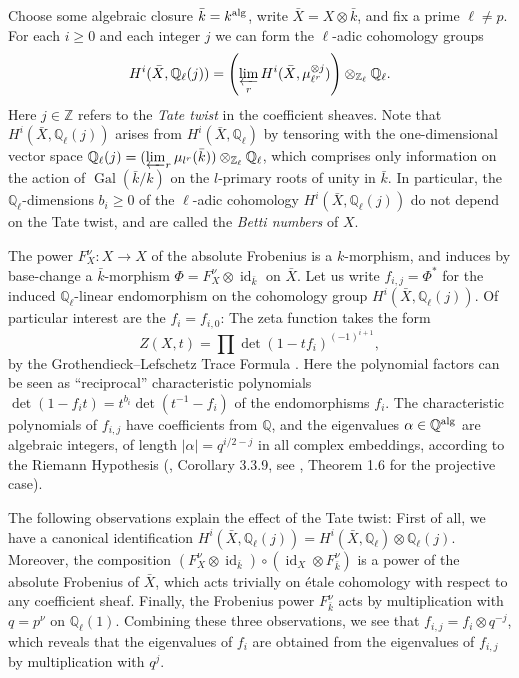 \documentclass[oneside, 12pt]{amsart}
\theoremstyle{definition}
\theoremstyle{remark}
\newcommand{\ZZ}{\mathbb{Z}}
\newcommand{\QQ}{\mathbb{Q}}
\newcommand{\alg}{\text{\rm alg}}
\newcommand{\Gal}{\operatorname{Gal}}
\newcommand{\id}{{\operatorname{id}}}
\newcommand{\invlim}{\varprojlim}
\newcommand{\ra}{\rightarrow}
\newcommand{\bk}{{\bar{k}}}
\newcommand{\bX}{{\bar{X}}}
\begin{document}
Choose some algebraic closure $\bk=k^\alg$, write $\bX=X\otimes \bk$, and fix a prime $\ell\neq p$. 
For each $i\geq 0$ and each integer $j$ we can form the  $\ell$-adic cohomology groups
\begin{equation}
\label{l-adic cohomology groups}
H^i(\bX,\QQ_\ell(j))= \left( \invlim_r H^i(\bX,\mu^{\otimes j}_{\ell^r})\right)\otimes_{\ZZ_\ell}\QQ_\ell.
\end{equation}
Here $j\in\ZZ$ refers to the \emph{Tate twist} in the coefficient sheaves. Note that $H^i(\bX,\QQ_\ell(j))$
arises from $H^i(\bX,\QQ_\ell)$ by tensoring with the one-dimensional  vector space
$\QQ_\ell(j)=(\invlim_r\mu_{l^r}(\bk))\otimes_{\ZZ_\ell}\QQ_\ell$, which comprises only information on the action of $\Gal(\bk/k)$
on the $l$-primary roots of unity in $\bk$.
In particular, the $\QQ_\ell$-dimensions $b_i\geq 0$ of the $\ell$-adic cohomology 
$H^i(\bX,\QQ_\ell(j))$ do not depend on the Tate twist, and are called  the \emph{Betti numbers} of $X$.

The   power $F^\nu_X:X\ra X$ of the absolute Frobenius is a $k$-morphism, and induces by base-change a 
$\bk$-morphism $\Phi=F^\nu_X\otimes \id_\bk$ on $\bX$. Let us write $f_{i,j}=\Phi^*$ for the induced 
$\QQ_\ell$-linear endomorphism on the    cohomology group $H^i(\bX,\QQ_\ell(j))$. Of particular interest are the $f_i=f_{i,0}$:
The zeta function takes the form 
$$
Z(X,t)=\prod \det(1-tf_i)^{(-1)^{i+1}},
$$
by the  Grothendieck--Lefschetz Trace Formula \cite{FL}.
Here the  polynomial factors can be seen as
``reciprocal'' characteristic polynomials 
$\det(1-f_it)=t^{b_i}\det(t^{-1}-f_i)$ of the endomorphisms $f_i$. 
The characteristic polynomials of $f_{i,j}$ have coefficients from $\QQ$, and the eigenvalues
$\alpha\in\QQ^\alg$ are algebraic integers, 
of  length $|\alpha|=q^{i/2-j}$ in all complex embeddings, according to the Riemann Hypothesis (\cite{Deligne 1980}, Corollary 3.3.9,
see   \cite{Deligne 1974}, Theorem 1.6 for the projective case).

The following observations explain the  effect of the Tate twist:
First of all, we have a canonical identification $H^i(\bX,\QQ_\ell(j))=H^i(\bX,\QQ_\ell)\otimes \QQ_\ell(j)$.
Moreover, the  composition $(F_X^\nu\otimes\id_\bk)\circ (\id_X\otimes F_\bk^\nu)$ is a power of the absolute Frobenius of $\bX$, which
acts trivially on \'etale cohomology   with respect to any coefficient sheaf.
Finally, the Frobenius power $F_\bk^\nu$ acts by multiplication with $q=p^\nu$ on $\QQ_\ell(1)$. Combining these three observations,
we see that $f_{i,j}=f_i\otimes q^{-j}$, which reveals that the eigenvalues of $f_i$ are obtained from the eigenvalues of $f_{i,j}$
by multiplication with $q^j$.
\end{document}
